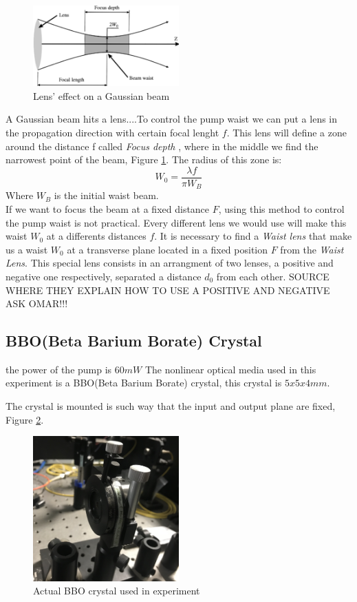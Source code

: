 \begin{figure}
\centering
\includegraphics[width=0.5\textwidth]{Figures/waist.png}
\caption{Lens' effect on a Gaussian beam} 
\label{fig:waist}
\end{figure}
A Gaussian beam hits a lens....To control the pump waist we can put a lens in the propagation direction with certain focal lenght $f$. This lens will define a zone around
the distance f called \textit{Focus depth}\cite{hecht} , where in the middle we find the narrowest point of the beam, Figure \ref{fig:waist}.
The radius of this zone is:
\begin{equation}
 W_0=\frac{\lambda f}{\pi W_B}
\end{equation}
Where $W_B$ is the initial waist beam. 
\\
If we want to focus the beam at a fixed distance $F$, using this method to control the pump waist is not practical. 
Every different lens we would use will make this waist $W_0$ at a differents distances $f$. It is necessary to find a \textit{Waist lens}
that make us a waist $W_0$ at a transverse plane located in a fixed position $F$ from the \textit{Waist Lens}. This
special lens consists in an arrangment of two lenses, a positive and negative one respectively, separated a distance 
$d_0$ from each other.
SOURCE WHERE THEY EXPLAIN HOW TO USE A POSITIVE AND NEGATIVE ASK OMAR!!!


\subsection{BBO(Beta Barium Borate) Crystal}

the power of the pump is $60mW$
The nonlinear optical media used in this experiment is a BBO(Beta Barium Borate) crystal, this crystal is $5x5x4 mm$.

The crystal is mounted is such way that the input and output plane are fixed, Figure \ref{fig:bbo}.
\begin{figure}
\centering
\includegraphics[width=0.5\textwidth]{Figures/bbo.jpg}
\caption{Actual BBO crystal used in experiment} 
\label{fig:bbo}
\end{figure}
 



